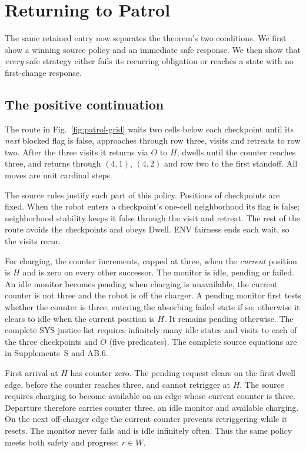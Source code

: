 \section{Returning to Patrol}\label{sec:patrol}
The same retained entry now separates the theorem's two conditions. We
first show a winning source policy and an immediate safe response. We then
show that \emph{every} safe strategy either fails its recurring obligation
or reaches a state with no first-change response.

\subsection{The positive continuation}
The route in Fig.~\ref{fig:patrol-grid} waits two cells below each checkpoint
until its \emph{next} blocked flag is false, approaches through row three,
visits and retreats to row two. After the three visits it returns via $O$
to $H$, dwells until the counter reaches three, and returns through $(4,1)$,
$(4,2)$ and row two to the first standoff. All moves are unit cardinal steps.

The source rules justify each part of this policy. Positions of checkpoints
are fixed. When the robot enters a checkpoint's one-cell neighborhood its
flag is false; neighborhood stability keeps it false through the visit and
retreat. The rest of the route avoids the checkpoints and obeys Dwell.
ENV fairness ends each wait, so the visits recur.

For charging, the counter increments, capped at three, when the \emph{current}
position is $H$ and is zero on every other successor. The monitor is idle,
pending or failed. An idle monitor becomes pending when charging is unavailable,
the current counter is not three and the robot is off the charger. A pending
monitor first tests whether the counter is three, entering the absorbing failed
state if so; otherwise it clears to idle when the current position is $H$.
It remains pending otherwise. The complete SYS justice list requires infinitely many idle states
and visits to each of the three checkpoints and $O$ (five predicates). The complete source equations
are in Supplements~S and AB.6.

First arrival at $H$ has counter zero. The pending request clears on the
first dwell edge, before the counter reaches three, and cannot retrigger at
$H$. The source requires charging to become available on an edge whose
current counter is three. Departure therefore carries counter three, an idle
monitor and available charging. On the next off-charger edge the current
counter prevents retriggering while it resets. The monitor never fails and
is idle infinitely often. Thus the same policy meets both safety and progress:
$r\in W$.

